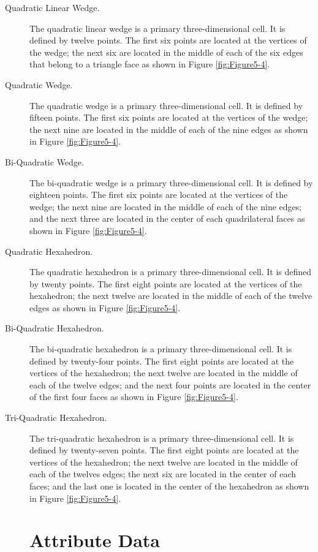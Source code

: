 \begin{description}
\item[Quadratic Linear Wedge.] The quadratic linear wedge is a primary three-dimensional cell. It is defined by twelve points. The first six points are located at the vertices of the wedge; the next six are located in the middle of each of the six edges that belong to a triangle face as shown in Figure \ref{fig:Figure5-4}.

\item[Quadratic Wedge.] The quadratic wedge is a primary three-dimensional cell. It is defined by fifteen points. The first six points are located at the vertices of the wedge; the next nine are located in the middle of each of the nine edges as shown in Figure \ref{fig:Figure5-4}.

\item[Bi-Quadratic Wedge.] The bi-quadratic wedge is a primary three-dimensional cell. It is defined by eighteen points. The first six points are located at the vertices of the wedge; the next nine are located in the middle of each of the nine edges; and the next three are located in the center of each quadrilateral faces as shown in Figure \ref{fig:Figure5-4}.

\item[Quadratic Hexahedron.] The quadratic hexahedron is a primary three-dimensional cell. It is defined by twenty points. The first eight points are located at the vertices of the hexahedron; the next twelve are located in the middle of each of the twelve edges as shown in Figure \ref{fig:Figure5-4}.

\item[Bi-Quadratic Hexahedron.] The bi-quadratic hexahedron is a primary three-dimensional cell. It is defined by twenty-four points. The first eight points are located at the vertices of the hexahedron; the next twelve are located in the middle of each of the twelve edges; and the next four points are located in the center of the first four faces as shown in Figure \ref{fig:Figure5-4}.

\item[Tri-Quadratic Hexahedron.] The tri-quadratic hexahedron is a primary three-dimensional cell. It is defined by twenty-seven points. The first eight points are located at the vertices of the hexahedron; the next twelve are located in the middle of each of the twelves edges; the next six are located in the center of each faces; and the last one is located in the center of the hexahedron as shown in Figure \ref{fig:Figure5-4}.

\section{Attribute Data}


\end{description}

